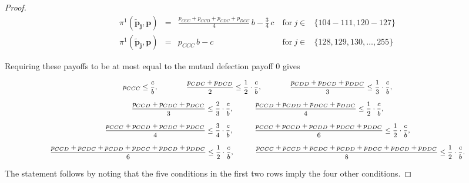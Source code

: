 \documentclass[11pt]{article}
\theoremstyle{plainCl1}
\theoremstyle{plainCl2}
\begin{document}
\begin{proof}
\begin{equation*}
\begin{array}{lclll}
  \pi^1(\mathbf{\tilde p_j},\mathbf{p}) &= 
  &\displaystyle \frac{p_{CCC} + p_{CCD} + p_{CDC} + p_{DCC}}{4} \, b - \frac{3}{4} \, c
  &~\text{for}~ j\! \in\! 
  & \{ 104\!-\!111, 120\!- \!127\} \\ [0.2cm]
  
  \pi^1(\mathbf{\tilde p_j},\mathbf{p}) &= 
  &\displaystyle p_{CCC} \, b - c
  &~\text{for}~ j\! \in\! 
  & \{128, 129, 130, \dots, 255\}
  \end{array}
  \end{equation*}
  
  \noindent
  Requiring these payoffs to be at most  equal to the mutual defection payoff 0
  gives

  \begin{equation*} \footnotesize
  \begin{array}{c}
  \displaystyle  p_{CCC} \leq \frac{c}{b}, 
    \qquad \qquad \frac{p_{CDC} + p_{DCD}}{2} \leq \frac{1}{2} \cdot \frac{c}{b}, 
    \qquad \qquad \frac{p_{CDD} + p_{DCD} + p_{DDC}}{3} \leq \frac{1}{3} \cdot \frac{c}{b},\\[0.45cm]
  \displaystyle  \frac{p_{CCD} + p_{CDC} + p_{DCC}}{3} \leq \frac{2}{3} \cdot \frac{c}{b},
    \quad \qquad \frac{p_{CCD} + p_{CDD} + p_{DCC} + p_{DDC}}{4} \leq \frac{1}{2}  \cdot \frac{c}{b}, \\[0.45cm]
    \displaystyle  \frac{p_{CCC} + p_{CCD} + p_{CDC} + p_{DCC}}{4} \leq \frac{3}{4} \cdot \frac{c}{b},
    \quad \qquad \frac{p_{CCC} + p_{CCD} + p_{CDD} + p_{DCC} + p_{DDC}}{6} \leq \frac{1}{2}  \cdot \frac{c}{b}, \\[0.45cm]
    \displaystyle  \frac{p_{CCD} + p_{CDC} + p_{CDD} + p_{DCC} + p_{DCD} + p_{DDC}}{6} \leq \frac{1}{2}  \cdot \frac{c}{b},
    \quad \qquad \frac{p_{CCC} + p_{CCD} + p_{CDC} +  p_{CDD} + p_{DCC} +  p_{DCD} + p_{DDC}}{8} \leq \frac{1}{2}  \cdot \frac{c}{b}.
    \end{array}
  \end{equation*}

  \noindent
  The statement follows by noting that the five conditions in the first two rows imply the four other conditions.
\end{proof}
 
{\setlength{\bibsep}{0\baselineskip}


}
\end{document}
